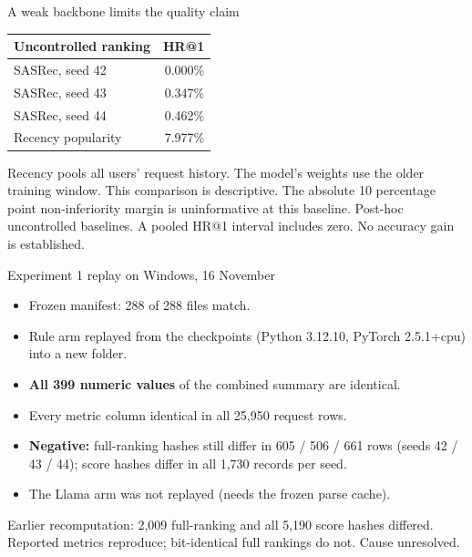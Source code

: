 \documentclass[10pt]{beamer}
\newcommand{\toprule}{\hline}
\newcommand{\midrule}{\hline}
\newcommand{\bottomrule}{\hline}
\newcommand{\src}[1]{\vfill{\tiny\color{bcitgray}#1}}
\begin{document}
\begin{frame}{A weak backbone limits the quality claim}
\begin{tabular}{@{}lr@{}}
\toprule
Uncontrolled ranking & HR@1\\\midrule
SASRec, seed 42 & 0.000\%\\
SASRec, seed 43 & 0.347\%\\
SASRec, seed 44 & 0.462\%\\
Recency popularity & 7.977\%\\\bottomrule
\end{tabular}\par
\vspace{0.3cm}
Recency pools all users' request history. The model's weights use the older training window. This comparison is descriptive.
\vspace{0.2cm}
The absolute 10 percentage point non-inferiority margin is uninformative at this baseline.
\src{Post-hoc uncontrolled baselines. A pooled HR@1 interval includes zero. No accuracy gain is established.}
\end{frame}

\begin{frame}{Experiment 1 replay on Windows, 16 November}
\small
\begin{itemize}
\item Frozen manifest: 288 of 288 files match.
\item Rule arm replayed from the checkpoints (Python 3.12.10, PyTorch 2.5.1+cpu) into a new folder.
\item \textbf{All 399 numeric values} of the combined summary are identical.
\item Every metric column identical in all 25,950 request rows.
\item \textbf{Negative:} full-ranking hashes still differ in 605 / 506 / 661 rows (seeds 42 / 43 / 44); score hashes differ in all 1,730 records per seed.
\item The Llama arm was not replayed (needs the frozen parse cache).
\end{itemize}
\src{Earlier recomputation: 2,009 full-ranking and all 5,190 score hashes differed. Reported metrics reproduce; bit-identical full rankings do not. Cause unresolved.}
\end{frame}
\end{document}
